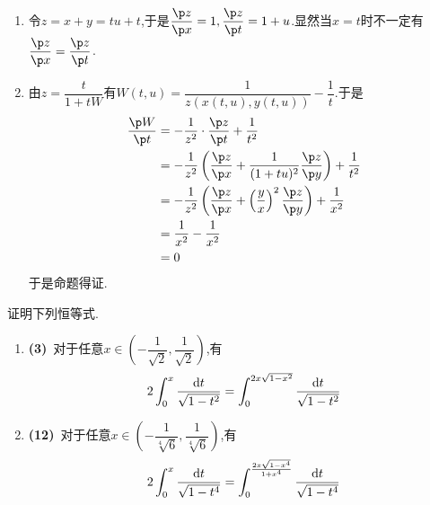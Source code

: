 \documentclass{ctexart}
\begin{document}
\begin{solution}
    \begin{enumerate}[label=\tbf{(\arabic*)}]
        \item 令$z=x+y=tu+t$,于是$\dfrac{\p z}{\p x}=1,\dfrac{\p z}{\p t}=1+u$.显然当$x=t$时不一定有$\dfrac{\p z}{\p x}=\dfrac{\p z}{\p t}$.
        \item 由$z=\dfrac{t}{1+tW}$有$W(t,u)=\dfrac{1}{z(x(t,u),y(t,u))}-\dfrac{1}{t}$.于是
            \[\begin{aligned}
                \dfrac{\p W}{\p t}
                &= -\dfrac{1}{z^2}\cdot\dfrac{\p z}{\p t}+\dfrac{1}{t^2} \\
                &= -\dfrac{1}{z^2}\left(\dfrac{\p z}{\p x}+\dfrac{1}{(1+tu)^2}\dfrac{\p z}{\p y}\right)+\dfrac{1}{t^2} \\
                &= -\dfrac{1}{z^2}\left(\dfrac{\p z}{\p x}+\left(\dfrac{y}{x}\right)^2\dfrac{\p z}{\p y}\right)+\dfrac{1}{x^2} \\
                &= \dfrac{1}{x^2}-\dfrac{1}{x^2} \\
                &= 0
            \end{aligned}\]
            于是命题得证.
    \end{enumerate}
\end{solution}
\begin{problem}[8.(15\songti{分})]
    证明下列恒等式.
    \begin{enumerate}[label=\tbf{(\arabic*)}]
        \item \textbf{(3)}\ 对于任意$x\in\left(-\dfrac{1}{\sqrt2},\dfrac{1}{\sqrt2}\right)$,有\[2\int_0^x\dfrac{\mathrm{d} t}{\sqrt{1-t^2}}=\int_0^{2x\sqrt{1-x^2}}\dfrac{\mathrm{d} t}{\sqrt{1-t^2}}\]
        \item \textbf{(12)}\ 对于任意$x\in\left(-\dfrac{1}{\sqrt[4]{6}},\dfrac{1}{\sqrt[4]{6}}\right)$,有\[2\int_0^x\dfrac{\mathrm{d} t}{\sqrt{1-t^4}}=\int_{0}^{\frac{2x\sqrt{1-x^4}}{1+x^4}}\dfrac{\mathrm{d} t}{\sqrt{1-t^4}}\]
    \end{enumerate}
\end{problem}
\end{document}
